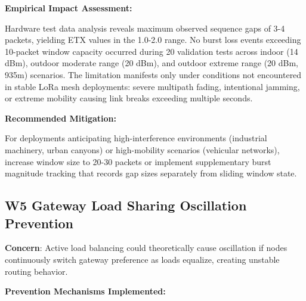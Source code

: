 \textbf{Empirical Impact Assessment:}

Hardware test data analysis reveals maximum observed sequence gaps of 3-4 packets, yielding ETX values in the 1.0-2.0 range. No burst loss events exceeding 10-packet window capacity occurred during 20 validation tests across indoor (14 dBm), outdoor moderate range (20 dBm), and outdoor extreme range (20 dBm, 935m) scenarios. The limitation manifests only under conditions not encountered in stable LoRa mesh deployments: severe multipath fading, intentional jamming, or extreme mobility causing link breaks exceeding multiple seconds.

\textbf{Recommended Mitigation:}

For deployments anticipating high-interference environments (industrial machinery, urban canyons) or high-mobility scenarios (vehicular networks), increase window size to 20-30 packets or implement supplementary burst magnitude tracking that records gap sizes separately from sliding window state.

\subsection{W5 Gateway Load Sharing Oscillation Prevention}

\textbf{Concern}: Active load balancing could theoretically cause oscillation if nodes continuously switch gateway preference as loads equalize, creating unstable routing behavior.

\textbf{Prevention Mechanisms Implemented:}

